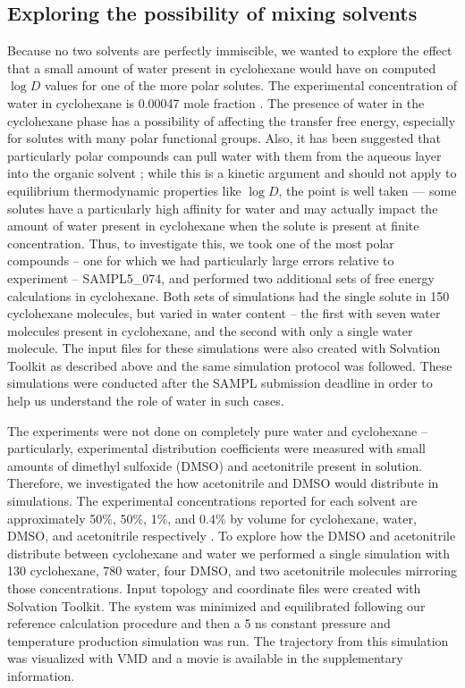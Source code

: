 \subsection{Exploring the possibility of mixing solvents}
Because no two solvents are perfectly immiscible, we wanted to explore the effect that a small amount of water present in cyclohexane would have on computed $\log D$ values for one of the more polar solutes. 
The experimental concentration of water in cyclohexane is 0.00047 mole fraction \cite{Black:1948bs}. 
The presence of water in the cyclohexane phase has a possibility of affecting the transfer free energy, especially for solutes with many polar functional groups. 
Also, it has been suggested that particularly polar compounds can pull water with them from the aqueous layer into the organic solvent \cite{Leo:1971wu}; while this is a kinetic argument and should not apply to equilibrium thermodynamic properties like $\log D$, the point is well taken --- some solutes have a particularly high affinity for water and may actually impact the amount of water present in cyclohexane when the solute is present at finite concentration.
Thus, to investigate this, we took one of the most polar compounds -- one for which we had particularly large errors relative to experiment -- SAMPL5\_074, and performed two additional sets of free energy calculations in cyclohexane. 
Both sets of simulations had the single solute in 150 cyclohexane molecules, but varied in water content -- the first with seven water molecules present in cyclohexane, and the second with only a single water molecule.  
The input files for these simulations were also created with Solvation Toolkit as described above and the same simulation protocol was followed. 
These simulations were conducted after the SAMPL submission deadline in order to help us understand the role of water in such cases.

The experiments were not done on completely pure water and cyclohexane -- particularly, experimental distribution coefficients were measured with small amounts of dimethyl sulfoxide (DMSO) and acetonitrile present in solution. 
Therefore, we investigated the how acetonitrile and DMSO would distribute in simulations. 
The experimental concentrations reported for each solvent are approximately 50\%, 50\%, 1\%, and 0.4\% by volume for cyclohexane, water, DMSO, and acetonitrile respectively  \cite{Rustenburg:sampl5}.
To explore how the DMSO and acetonitrile distribute between cyclohexane and water we performed a single simulation with 130 cyclohexane, 780 water, four DMSO, and two acetonitrile molecules mirroring those concentrations. 
Input topology and coordinate files were created with Solvation Toolkit. 
The system was minimized and equilibrated following our reference calculation procedure and then a 5 ns constant pressure and temperature production simulation was run. 
The trajectory from this simulation was visualized with VMD  \cite{VMD} and a movie is available in the supplementary information. 


